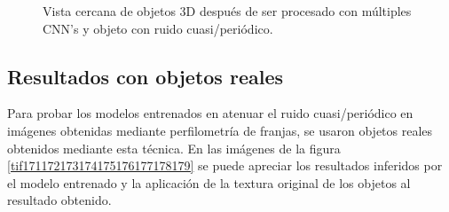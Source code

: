 \documentclass[10pt,letterpaper]{article}
\begin{document}
\begin{figure}[H]
\begin{center}
        \caption{Vista cercana de objetos 3D después de ser procesado con múltiples CNN's y objeto con ruido cuasi/periódico.}
        \label{tif165166167168169170}
      \end{center}
\end{figure}


\subsection*{Resultados con objetos reales}
Para probar los modelos entrenados en atenuar el ruido cuasi/periódico en imágenes obtenidas mediante perfilometría de franjas, se usaron objetos reales obtenidos mediante esta técnica. En las imágenes de la figura \ref{tif171172173174175176177178179} se puede apreciar los resultados inferidos por el modelo entrenado y la aplicación de la textura original de los objetos al resultado obtenido. 
\end{document}
